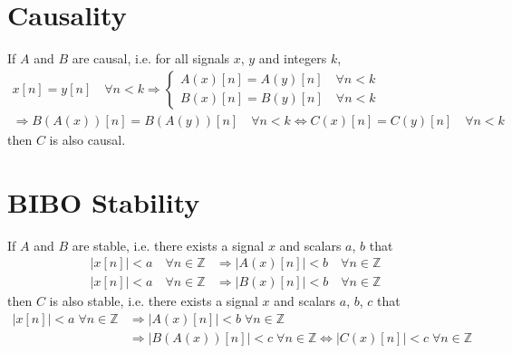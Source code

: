 \documentclass[a4paper,12pt]{article}
\begin{document}
\section{Causality}
If $A$ and $B$ are causal, i.e. for all signals $x$, $y$ and integers $k$,
\begin{multline*}
  x[n] = y[n]\quad\forall n < k
  \Longrightarrow\begin{cases}
    A(x)[n] = A(y)[n]\quad\forall n < k\\
    B(x)[n] = B(y)[n]\quad\forall n < k
  \end{cases}\\
  \Longrightarrow B(A(x))[n] = B(A(y))[n]\quad\forall n < k
  \iff C(x)[n] = C(y)[n]\quad\forall n < k
\end{multline*}
then $C$ is also causal.

\section{BIBO Stability}
If $A$ and $B$ are stable, i.e. there exists a signal $x$
and scalars $a$, $b$ that
\begin{align*}
  |x[n]| < a\quad\forall n \in \mathbb Z
  &\Longrightarrow |A(x)[n]| < b\quad\forall n \in \mathbb Z\\
  |x[n]| < a\quad\forall n \in \mathbb Z
  &\Longrightarrow |B(x)[n]| < b\quad\forall n \in \mathbb Z
\end{align*}
then $C$ is also stable, i.e. there exists a signal $x$
and scalars $a$, $b$, $c$ that
\begin{align*}
  |x[n]| < a\;\forall n \in \mathbb Z
  &\Longrightarrow |A(x)[n]| < b\;\forall n \in \mathbb Z\\
  &\Longrightarrow |B(A(x))[n]| < c\;\forall n \in \mathbb Z
  \iff |C(x)[n]| < c\;\forall n \in \mathbb Z
\end{align*}
\end{document}
